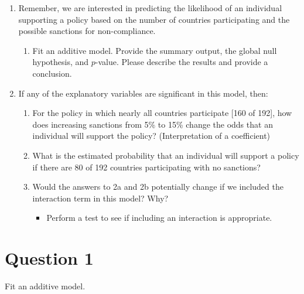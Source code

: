 \documentclass[12pt,letterpaper]{article}
\begin{document}
\begin{enumerate}
	\item
	Remember, we are interested in predicting the likelihood of an individual supporting a policy based on the number of countries participating and the possible sanctions for non-compliance.
	\begin{enumerate}
		\item [] Fit an additive model. Provide the summary output, the global null hypothesis, and $p$-value. Please describe the results and provide a conclusion.
	\end{enumerate}
	
	\item
	If any of the explanatory variables are significant in this model, then:
	\begin{enumerate}
		\item
		For the policy in which nearly all countries participate [160 of 192], how does increasing sanctions from 5\% to 15\% change the odds that an individual will support the policy? (Interpretation of a coefficient)
		\item
		What is the estimated probability that an individual will support a policy if there are 80 of 192 countries participating with no sanctions? 
		\item
		Would the answers to 2a and 2b potentially change if we included the interaction term in this model? Why? 
		\begin{itemize}
			\item Perform a test to see if including an interaction is appropriate.
		\end{itemize}
	\end{enumerate}
	\end{enumerate}

\newpage
	\section*{Question 1}

\noindent[] Fit an additive model. 
\\\\
\end{document}
